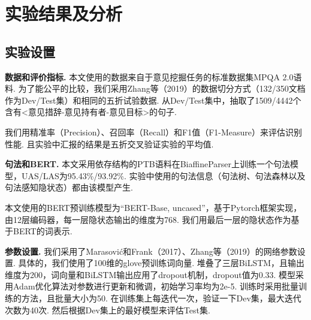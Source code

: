 
\section{实验结果及分析}
\subsection{实验设置}
\textbf{数据和评价指标. } 本文使用的数据来自于意见挖掘任务的标准数据集MPQA 2.0语料. 为了能公平的比较，我们采用Zhang等（2019）的数据切分方式（132/350文档作为Dev/Test集）和相同的五折试验数据. 从Dev/Test集中，抽取了1509/4442个含有<意见措辞-意见持有者-意见目标>的句子.

我们用精准率（Precision）、召回率（Recall）和F1值（F1-Measure）来评估识别性能. 且实验中汇报的结果是五折交叉验证实验的平均值.

\textbf{句法和BERT. }
本文采用依存结构的PTB语料在BiaffineParser上训练一个句法模型，UAS/LAS为95.43\%/93.92\%. 实验中使用的句法信息（句法树、句法森林以及句法感知隐状态）都由该模型产生.

本文使用的BERT预训练模型为“BERT-Base, uncased”，基于Pytorch框架实现，由12层编码器，每一层隐状态输出的维度为768. 我们用最后一层的隐状态作为基于BERT的词表示.

\textbf{参数设置. }
我们采用了Marasovi{\'c}和Frank（2017）、Zhang等（2019）的网络参数设置. 具体的，我们使用了100维的glove预训练词向量. 堆叠了三层BiLSTM，且输出维度为200，词向量和BiLSTM输出应用了dropout机制，dropout值为0.33. 模型采用Adam优化算法对参数进行更新和微调，初始学习率均为2e-5. 训练时采用批量训练的方法，且批量大小为50. 在训练集上每迭代一次，验证一下Dev集，最大迭代次数为40次. 然后根据Dev集上的最好模型来评估Test集.


